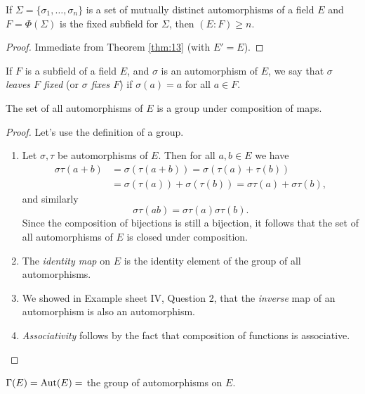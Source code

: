 \begin{corollary}\label{cor:to-thm-13}
	If $\Sigma = \{\sigma_1, \dots, \sigma_n\}$ is a set of mutually distinct automorphisms of a field $E$ and $F = \Phi(\Sigma)$ is the fixed subfield for $\Sigma$, then $(E : F) \geq n$.
	\begin{proof}
		Immediate from Theorem \ref{thm:13} (with $E' = E$).
	\end{proof}
\end{corollary}

\begin{definition}
	If $F$ is a subfield of a field $E$, and $\sigma$ is an automorphism of $E$, we say that \emph{$\sigma$ leaves $F$ fixed} (or \emph{$\sigma$ fixes $F$}) if $\sigma(a) = a$ for all $a \in F$.
\end{definition}

\begin{proposition}
	The set of all automorphisms of $E$ is a group under composition of maps.
	\begin{proof}
		Let's use the definition of a group.
		\begin{enumerate}
			\item Let $\sigma, \tau$ be automorphisms of $E$. Then for all $a, b \in E$ we have
			\begin{align*}
				\sigma\tau(a + b) &= \sigma(\tau(a + b)) = \sigma(\tau(a) + \tau(b)) \\
					&= \sigma(\tau(a)) + \sigma(\tau(b)) = \sigma\tau(a) + \sigma\tau(b),
			\end{align*}
			and similarly
			\[
				\sigma\tau(ab) = \sigma\tau(a)\sigma\tau(b).
			\]
			Since the composition of bijections is still a bijection, it follows that the set of all automorphisms of $E$ is closed under composition.
			\item The \emph{identity map} on $E$ is the identity element of the group of all automorphisms.
			\item We showed in Example sheet IV, Question 2, that the \emph{inverse} map of an automorphism is also an automorphism.
			\item \emph{Associativity} follows by the fact that composition of functions is associative.
		\end{enumerate}
	\end{proof}
\end{proposition}

\begin{notation}
	$\Gamma(E) = \text{Aut}(E) =$ the group of automorphisms on $E$.
\end{notation}

